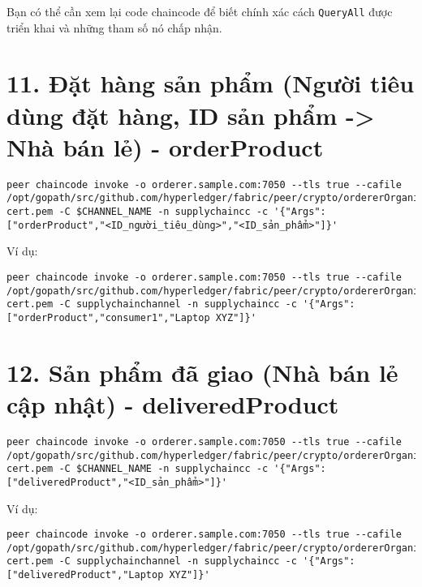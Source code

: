 \documentclass{article}
\begin{document}
Bạn có thể cần xem lại code chaincode để biết chính xác cách \texttt{QueryAll} được triển khai và những tham số nó chấp nhận.

\section{11. Đặt hàng sản phẩm (Người tiêu dùng đặt hàng, ID sản phẩm -> Nhà bán lẻ) - orderProduct}

\begin{lstlisting}[breaklines=true]
peer chaincode invoke -o orderer.sample.com:7050 --tls true --cafile /opt/gopath/src/github.com/hyperledger/fabric/peer/crypto/ordererOrganizations/sample.com/orderers/orderer.sample.com/msp/tlscacerts/tlsca.sample.com-cert.pem -C $CHANNEL_NAME -n supplychaincc -c '{"Args":["orderProduct","<ID_người_tiêu_dùng>","<ID_sản_phẩm>"]}'
\end{lstlisting}

Ví dụ:

\begin{lstlisting}[breaklines=true]
peer chaincode invoke -o orderer.sample.com:7050 --tls true --cafile /opt/gopath/src/github.com/hyperledger/fabric/peer/crypto/ordererOrganizations/sample.com/orderers/orderer.sample.com/msp/tlscacerts/tlsca.sample.com-cert.pem -C supplychainchannel -n supplychaincc -c '{"Args":["orderProduct","consumer1","Laptop XYZ"]}'
\end{lstlisting}

\section{12. Sản phẩm đã giao (Nhà bán lẻ cập nhật) - deliveredProduct}

\begin{lstlisting}[breaklines=true]
peer chaincode invoke -o orderer.sample.com:7050 --tls true --cafile /opt/gopath/src/github.com/hyperledger/fabric/peer/crypto/ordererOrganizations/sample.com/orderers/orderer.sample.com/msp/tlscacerts/tlsca.sample.com-cert.pem -C $CHANNEL_NAME -n supplychaincc -c '{"Args":["deliveredProduct","<ID_sản_phẩm>"]}'
\end{lstlisting}

Ví dụ:

\begin{lstlisting}[breaklines=true]
peer chaincode invoke -o orderer.sample.com:7050 --tls true --cafile /opt/gopath/src/github.com/hyperledger/fabric/peer/crypto/ordererOrganizations/sample.com/orderers/orderer.sample.com/msp/tlscacerts/tlsca.sample.com-cert.pem -C supplychainchannel -n supplychaincc -c '{"Args":["deliveredProduct","Laptop XYZ"]}'
\end{lstlisting}
\end{document}
